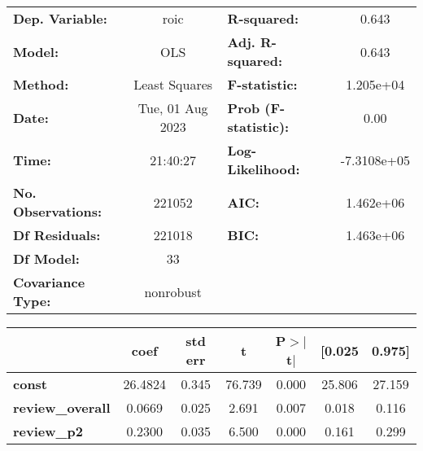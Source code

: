 \begin{center}
\begin{tabular}{lclc}
\toprule
\textbf{Dep. Variable:}                                               &       roic       & \textbf{  R-squared:         } &      0.643   \\
\textbf{Model:}                                                       &       OLS        & \textbf{  Adj. R-squared:    } &      0.643   \\
\textbf{Method:}                                                      &  Least Squares   & \textbf{  F-statistic:       } &  1.205e+04   \\
\textbf{Date:}                                                        & Tue, 01 Aug 2023 & \textbf{  Prob (F-statistic):} &      0.00    \\
\textbf{Time:}                                                        &     21:40:27     & \textbf{  Log-Likelihood:    } & -7.3108e+05  \\
\textbf{No. Observations:}                                            &      221052      & \textbf{  AIC:               } &  1.462e+06   \\
\textbf{Df Residuals:}                                                &      221018      & \textbf{  BIC:               } &  1.463e+06   \\
\textbf{Df Model:}                                                    &          33      & \textbf{                     } &              \\
\textbf{Covariance Type:}                                             &    nonrobust     & \textbf{                     } &              \\
\bottomrule
\end{tabular}
\begin{tabular}{lcccccc}
                                                                      & \textbf{coef} & \textbf{std err} & \textbf{t} & \textbf{P$> |$t$|$} & \textbf{[0.025} & \textbf{0.975]}  \\
\midrule
\textbf{const}                                                        &      26.4824  &        0.345     &    76.739  &         0.000        &       25.806    &       27.159     \\
\textbf{review\_overall}                                              &       0.0669  &        0.025     &     2.691  &         0.007        &        0.018    &        0.116     \\
\textbf{review\_p2}                                                   &       0.2300  &        0.035     &     6.500  &         0.000        &        0.161    &        0.299     \\

\end{tabular}
\end{center}
